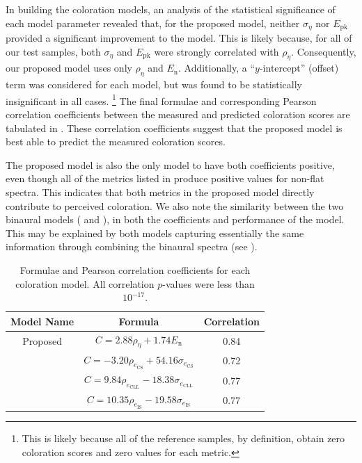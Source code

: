 In building the coloration models, an analysis of the statistical significance of each model parameter revealed that, for the proposed model, neither $\sigma_\eta$ nor $E_{\text{pk}}$ provided a significant improvement to the model.
This is likely because, for all of our test samples, both $\sigma_\eta$ and $E_{\text{pk}}$ were strongly correlated with $\rho_\eta$.
Consequently, our proposed model uses only $\rho_\eta$ and $E_\text{n}$.
Additionally, a ``$y$-intercept'' (offset) term was considered for each model, but was found to be statistically insignificant in all cases.%
\footnote{This is likely because all of the reference samples, by definition, obtain zero coloration scores and zero values for each metric.}
The final formulae and corresponding Pearson correlation coefficients between the measured and predicted coloration scores are tabulated in .
These correlation coefficients suggest that the proposed model is best able to predict the measured coloration scores.

The proposed model is also the only model to have both coefficients positive, even though all of the metrics listed in  produce positive values for non-flat spectra.
This indicates that both metrics in the proposed model directly contribute to perceived coloration.
We also note the similarity between the two binaural models (\citet{Pulkki1999} and \citet{Wittek2007}), in both the coefficients and performance of the model.
This may be explained by both models capturing essentially the same information through combining the binaural spectra (see ).

\begin{table}[t]
\centering
 \begin{tabular}{|c|c|c|} \hline
 \textbf{Model Name} & \textbf{Formula} & \textbf{Correlation} \\ \hline
 Proposed & $C = 2.88 \rho_\eta + 1.74 E_\text{n}$ & 0.84 \\
 \citet{Kates1984} & $C = -3.20 \rho_{e_\text{CS}} + 54.16 \sigma_{e_\text{CS}}$ & 0.72 \\
 \citet{Pulkki1999} & $C = 9.84 \rho_{e_\text{CLL}} - 18.38 \sigma_{e_\text{CLL}}$ & 0.77 \\
 \citet{Wittek2007} & $C = 10.35 \rho_{e_\text{IS}} - 19.58 \sigma_{e_\text{IS}}$ & 0.77 \\ \hline
 \end{tabular}
 \caption[Formulae and correlation coefficients for each coloration model.]{
 Formulae and Pearson correlation coefficients for each coloration model.
 All correlation $p$-values were less than $10^{-17}$.}
 \label{tab:Coloration_Model_Formulas}
\end{table}

